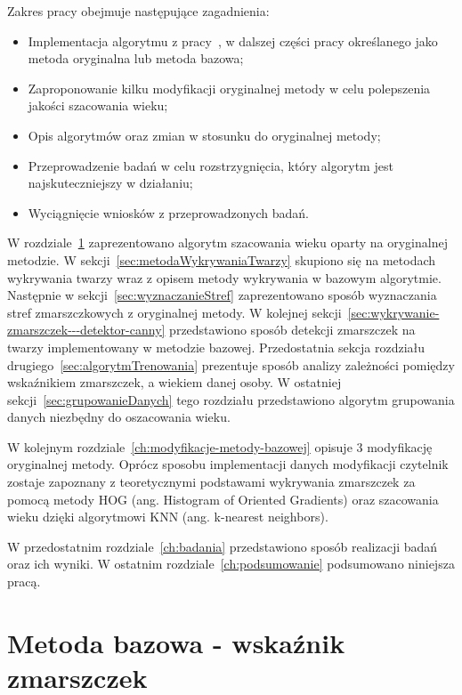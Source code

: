 \documentclass[a4paper,twoside,12pt]{book}
\begin{document}
    Zakres pracy obejmuje następujące zagadnienia:
    \begin{itemize}
        \item Implementacja algorytmu z pracy~\cite{wrinkleFeatures}, w dalszej części pracy określanego jako metoda
        oryginalna lub metoda bazowa;
        \item Zaproponowanie kilku modyfikacji oryginalnej metody w celu polepszenia jakości szacowania wieku;
        \item Opis algorytmów oraz zmian w stosunku do oryginalnej metody;
        \item Przeprowadzenie badań w celu rozstrzygnięcia, który algorytm jest najskuteczniejszy w działaniu;
        \item Wyciągnięcie wniosków z przeprowadzonych badań.
    \end{itemize}
    W rozdziale~\ref{ch:metoda-bazowa---wrinkle-feature} zaprezentowano algorytm szacowania wieku oparty na oryginalnej metodzie.
    W sekcji~\ref{sec:metodaWykrywaniaTwarzy} skupiono się na metodach wykrywania twarzy wraz z opisem
    metody wykrywania w bazowym algorytmie.
    Następnie w sekcji~\ref{sec:wyznaczanieStref} zaprezentowano sposób wyznaczania stref zmarszczkowych z oryginalnej metody.
    W kolejnej sekcji~\ref{sec:wykrywanie-zmarszczek---detektor-canny} przedstawiono sposób detekcji zmarszczek na twarzy implementowany
    w metodzie bazowej.
    Przedostatnia sekcja rozdziału drugiego~\ref{sec:algorytmTrenowania}  prezentuje sposób analizy %
    zależności pomiędzy wskaźnikiem zmarszczek, a wiekiem
    danej osoby.
    W ostatniej sekcji~\ref{sec:grupowanieDanych} tego rozdziału przedstawiono algorytm grupowania danych niezbędny do oszacowania wieku.

    W kolejnym rozdziale~\ref{ch:modyfikacje-metody-bazowej} opisuje 3 modyfikację oryginalnej metody.
    Oprócz sposobu implementacji danych modyfikacji czytelnik zostaje zapoznany z teoretycznymi podstawami wykrywania zmarszczek za
    pomocą metody HOG (ang. Histogram of Oriented Gradients) oraz szacowania wieku dzięki algorytmowi KNN (ang.  k-nearest neighbors).

    W przedostatnim rozdziale~\ref{ch:badania} przedstawiono sposób realizacji badań oraz ich wyniki.
    W ostatnim rozdziale~\ref{ch:podsumowanie} podsumowano niniejsza pracą.

    \chapter{Metoda bazowa - wskaźnik zmarszczek}\label{ch:metoda-bazowa---wrinkle-feature}
\end{document}
